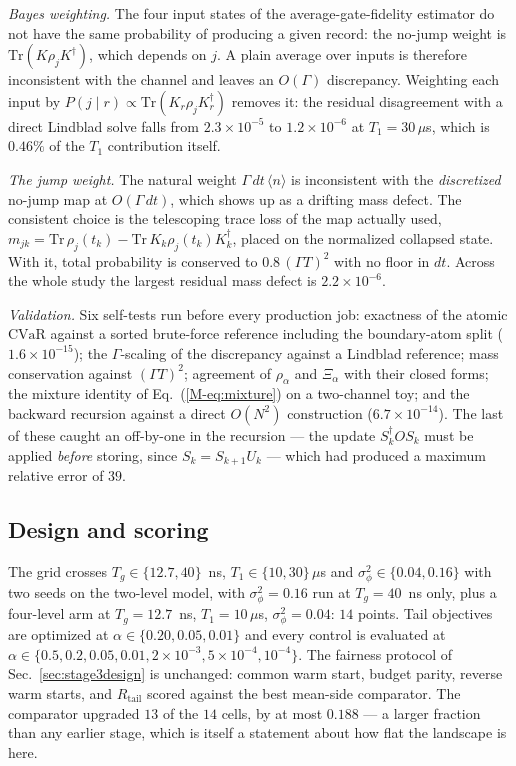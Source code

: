 \documentclass[aps,pra,onecolumn,notitlepage,superscriptaddress,nofootinbib,floatfix]{revtex4-2}
\newcommand{\cvar}{\mathrm{CVaR}}
\newcommand{\Rt}{R_{\mathrm{tail}}}
\begin{document}
\emph{Bayes weighting.} The four input states of the average-gate-fidelity
estimator do not have the same probability of producing a given record: the
no-jump weight is $\mathrm{Tr}(K\rho_jK^\dagger)$, which depends on $j$. A
plain average over inputs is therefore inconsistent with the channel and
leaves an $O(\Gamma)$ discrepancy. Weighting each input by
$P(j\mid r)\propto\mathrm{Tr}(K_r\rho_jK_r^\dagger)$ removes it: the residual
disagreement with a direct Lindblad solve falls from $2.3\times10^{-5}$ to
$1.2\times10^{-6}$ at $T_1=30\,\mu$s, which is $0.46\%$ of the $T_1$
contribution itself.

\emph{The jump weight.} The natural weight $\Gamma\,dt\,\langle n\rangle$ is
inconsistent with the \emph{discretized} no-jump map at $O(\Gamma\,dt)$, which
shows up as a drifting mass defect. The consistent choice is the telescoping
trace loss of the map actually used,
$m_{jk}=\mathrm{Tr}\,\rho_j(t_k)-\mathrm{Tr}\,K_k\rho_j(t_k)K_k^\dagger$,
placed on the normalized collapsed state. With it, total probability is
conserved to $0.8\,(\Gamma T)^2$ with no floor in $dt$. Across the whole study
the largest residual mass defect is $2.2\times10^{-6}$.

\emph{Validation.} Six self-tests run before every production job: exactness
of the atomic $\cvar$ against a sorted brute-force reference including the
boundary-atom split ($1.6\times10^{-15}$); the $\Gamma$-scaling of the
discrepancy against a Lindblad reference; mass conservation against
$(\Gamma T)^2$; agreement of $\rho_\alpha$ and $\Xi_\alpha$ with their
closed forms; the mixture identity of Eq.~(\ref{M-eq:mixture}) on a two-channel
toy; and the backward recursion against a direct $O(N^2)$ construction
($6.7\times10^{-14}$). The last of these caught an off-by-one in the
recursion --- the update $S_k^\dagger OS_k$ must be applied \emph{before}
storing, since $S_k=S_{k+1}U_k$ --- which had produced a maximum relative
error of $39$.

\subsection{Design and scoring}
The grid crosses $T_g\in\{12.7,40\}$~ns, $T_1\in\{10,30\}\,\mu$s and
$\sigma_\phi^2\in\{0.04,0.16\}$ with two seeds on the two-level model, with
$\sigma_\phi^2=0.16$ run at $T_g=40$~ns only, plus a four-level arm at
$T_g=12.7$~ns, $T_1=10\,\mu$s, $\sigma_\phi^2=0.04$: $14$ points. Tail
objectives are optimized at $\alpha\in\{0.20,0.05,0.01\}$ and every control is
evaluated at $\alpha\in\{0.5,0.2,0.05,0.01,2\times10^{-3},5\times10^{-4},
10^{-4}\}$. The fairness protocol of Sec.~\ref{sec:stage3design} is unchanged:
common warm start, budget parity, reverse warm starts, and $\Rt$ scored against
the best mean-side comparator. The comparator upgraded $13$ of the $14$ cells,
by at most $0.188$ --- a larger fraction than any earlier stage, which is
itself a statement about how flat the landscape is here.
\end{document}
